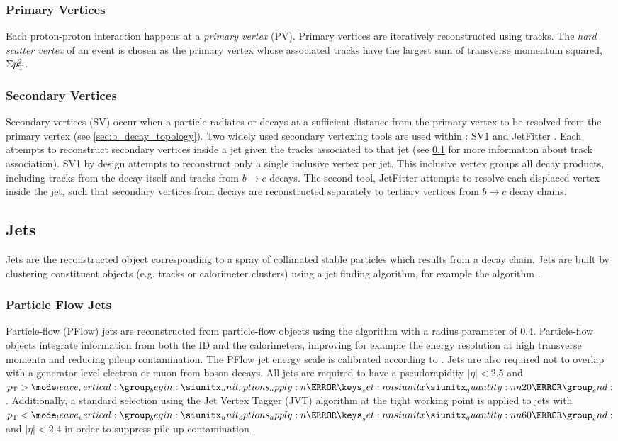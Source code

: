 \subsubsection{Primary Vertices}
Each proton-proton interaction happens at a \textit{primary vertex} (PV).
Primary vertices are iteratively reconstructed using tracks.
The \textit{hard scatter vertex} of an event is chosen as the primary vertex whose associated tracks have the largest sum of transverse momentum squared, $\Sigma p_{\text{T}}^2$.

\subsubsection{Secondary Vertices}
Secondary vertices (SV) occur when a particle radiates or decays at a sufficient distance from the primary vertex to be resolved from the primary vertex (see \cref{sec:b_decay_topology}).
Two widely used secondary vertexing tools are used within \ATLAS: SV1 and JetFitter \cite{FTAG-2018-01}.
Each attempts to reconstruct secondary vertices inside a jet given the tracks associated to that jet (see \cref{sec:jet_reco} for more information about track association).
SV1 by design attempts to reconstruct only a single inclusive vertex per jet.
This inclusive vertex groups all \bhadron decay products, including tracks from the \bhadron decay itself and tracks from $b \rightarrow c$ decays.
The second tool, JetFitter attempts to resolve each displaced vertex inside the jet, such that secondary vertices from \bhadron decays are reconstructed separately to tertiary vertices from $b \rightarrow c$ decay chains.


\subsection{Jets}\label{sec:jet_reco}
Jets are the reconstructed object corresponding to a spray of collimated stable particles which results from a decay chain.
Jets are built by clustering constituent objects (e.g. tracks or calorimeter clusters) using a jet finding algorithm, for example the \antikt algorithm \cite{Cacciari:2008gp}.

\subsubsection{Particle Flow Jets}
Particle-flow (PFlow) jets are reconstructed from particle-flow objects \cite{PERF-2015-09} using the \antikt algorithm with a radius parameter of $0.4$.
Particle-flow objects integrate information from both the ID and the calorimeters, improving for example the energy resolution at high transverse momenta and reducing pileup contamination.
The PFlow jet energy scale is calibrated according to .
Jets are also required not to overlap with a generator-level electron or muon from \Wboson boson decays.
All jets are required to have a pseudorapidity $|\eta| < 2.5$ and $\pt > \SI{20}{\GeV}$.
Additionally, a standard selection using the Jet Vertex Tagger (JVT) algorithm at the tight working point is applied to jets with $\pt < \SI{60}{\GeV}$ and $|\eta| < 2.4$ in order to suppress pile-up contamination \cite{ATLAS-CONF-2014-018}.

